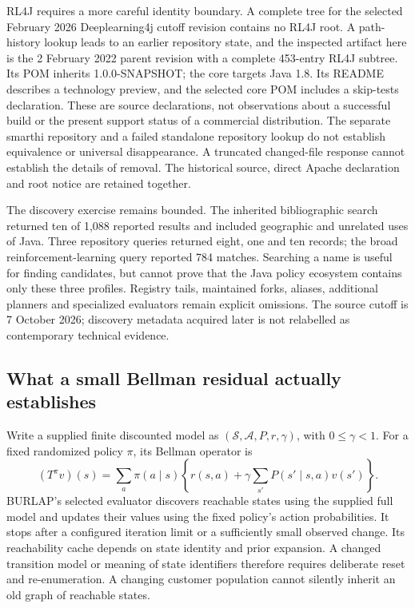 RL4J requires a more careful identity boundary. A complete tree for the selected February 2026 Deeplearning4j cutoff revision contains no RL4J root. A path-history lookup leads to an earlier repository state, and the inspected artifact here is the 2 February 2022 parent revision with a complete 453-entry RL4J subtree. Its POM inherits 1.0.0-SNAPSHOT; the core targets Java 1.8. Its README describes a technology preview, and the selected core POM includes a skip-tests declaration. These are source declarations, not observations about a successful build or the present support status of a commercial distribution. The separate smarthi repository and a failed standalone repository lookup do not establish equivalence or universal disappearance. A truncated changed-file response cannot establish the details of removal. The historical source, direct Apache declaration and root notice are retained together.\citep{exec24_policyjava_rl4j,exec24_policyjava_comparison}

The discovery exercise remains bounded. The inherited bibliographic search returned ten of 1,088 reported results and included geographic and unrelated uses of Java. Three repository queries returned eight, one and ten records; the broad reinforcement-learning query reported 784 matches. Searching a name is useful for finding candidates, but cannot prove that the Java policy ecosystem contains only these three profiles. Registry tails, maintained forks, aliases, additional planners and specialized evaluators remain explicit omissions. The source cutoff is 7 October 2026; discovery metadata acquired later is not relabelled as contemporary technical evidence.\citep{exec24_policyjava_comparison}

\subsection{What a small Bellman residual actually establishes}
Write a supplied finite discounted model as $(\mathcal S,\mathcal A,P,r,\gamma)$, with $0\leq\gamma<1$. For a fixed randomized policy $\pi$, its Bellman operator is
\[
 (T^\pi v)(s)=\sum_a\pi(a\mid s)\left\{r(s,a)+\gamma\sum_{s'}P(s'\mid s,a)v(s')\right\}.
\]
BURLAP's selected evaluator discovers reachable states using the supplied full model and updates their values using the fixed policy's action probabilities. It stops after a configured iteration limit or a sufficiently small observed change. Its reachability cache depends on state identity and prior expansion. A changed transition model or meaning of state identifiers therefore requires deliberate reset and re-enumeration. A changing customer population cannot silently inherit an old graph of reachable states.\citep{exec24_policyjava_burlap}

